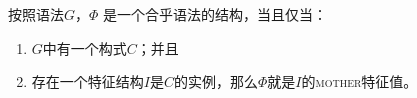 \ea
\label{meta-construction-statemnet}
按照语法$G$，$\Phi$ 是一个合乎语法的结构，当且仅当：
\begin{enumerate}
\item $G$中有一个构式$C$；并且
\item 存在一个特征结构$I$是$C$的实例，那么$\Phi$就是$I$的\textsc{mother}特征值。
\end{enumerate}
\z

